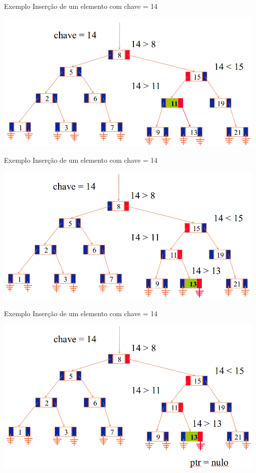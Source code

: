 \documentclass[12pt,table,xcolor={dvipsnames}]{beamer}
\begin{document}
\begin{frame}[fragile]{Exemplo}
Inserção de um elemento com chave = 14
\begin{center}
\includegraphics[scale=.3]{arv4.png} 
\end{center}
\end{frame}

\begin{frame}[fragile]{Exemplo}
Inserção de um elemento com chave = 14
\begin{center}
\includegraphics[scale=.3]{arv5.png} 
\end{center}
\end{frame}

\begin{frame}[fragile]{Exemplo}
Inserção de um elemento com chave = 14
\begin{center}
\includegraphics[scale=.3]{arv6.png} 
\end{center}
\end{frame}
\end{document}
